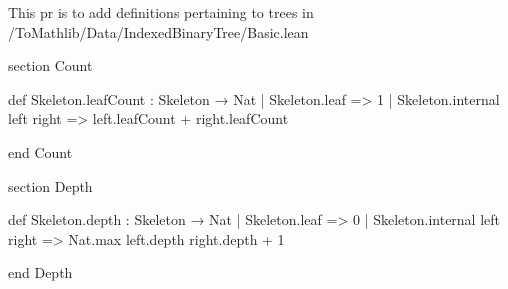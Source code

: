 This pr is to add definitions pertaining to trees in /ToMathlib/Data/IndexedBinaryTree/Basic.lean

section Count

def Skeleton.leafCount : Skeleton → Nat
  | Skeleton.leaf => 1
  | Skeleton.internal left right =>
    left.leafCount + right.leafCount

end Count

section Depth

def Skeleton.depth : Skeleton → Nat
  | Skeleton.leaf => 0
  | Skeleton.internal left right =>
    Nat.max left.depth right.depth + 1

end Depth